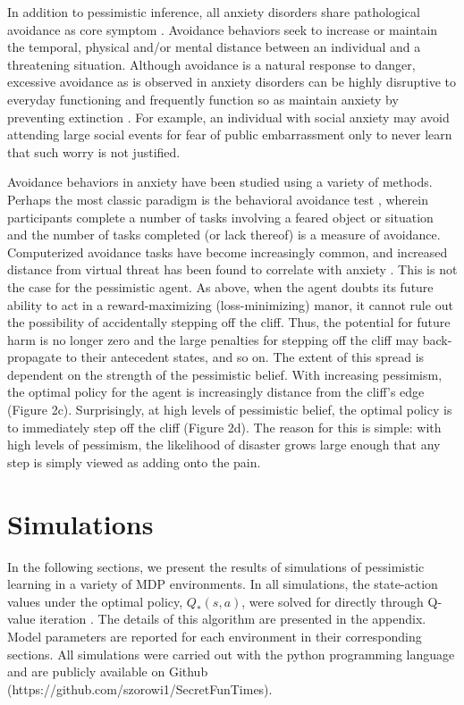 \documentclass[11pt]{article} %
\begin{document}
In addition to pessimistic inference, all anxiety disorders share pathological avoidance as core symptom \citep{dsm5, Krypotos2015, Arnaudova2017}. Avoidance behaviors seek to increase or maintain the temporal, physical and/or mental distance between an individual and a threatening situation. Although avoidance is a natural response to danger, excessive avoidance as is observed in anxiety disorders can be highly disruptive to everyday functioning \citep{Salter2004} and frequently function so as maintain anxiety by preventing extinction \citep{Arnaudova2017}. For example, an individual with social anxiety may avoid attending large social events for fear of public embarrassment only to never learn that such worry is not justified.

Avoidance behaviors in anxiety have been studied using a variety of methods. Perhaps the most classic paradigm is the behavioral avoidance test \citep{bandura1977}, wherein participants complete a number of tasks involving a feared object or situation and the number of tasks completed (or lack thereof) is a measure of avoidance. Computerized avoidance tasks have become increasingly common, and increased distance from virtual threat has been found to correlate with anxiety \citep{Bach2014, Bach2017, Sheynin2014}. This is not the case for the pessimistic agent. As above, when the agent doubts its future ability to act in a reward-maximizing (loss-minimizing) manor, it cannot rule out the possibility of accidentally stepping off the cliff. Thus, the potential for future harm is no longer zero and the large penalties for stepping off the cliff may back-propagate to their antecedent states, and so on. The extent of this spread is dependent on the strength of the pessimistic belief. With increasing pessimism, the optimal policy for the agent is increasingly distance from the cliff's edge (Figure 2c). Surprisingly, at high levels of pessimistic belief, the optimal policy is to immediately step off the cliff (Figure 2d). The reason for this is simple: with high levels of pessimism, the likelihood of disaster grows large enough that any step is simply viewed as adding onto the pain.

\section{Simulations}

In the following sections, we present the results of simulations of pessimistic learning in a variety of MDP environments. In all simulations, the state-action values under the optimal policy, $Q_*(s,a)$, were solved for directly through Q-value iteration \citep{SuttonBarto1998, SuttonBarto1998, bertsekas2005}. The details of this algorithm are presented in the appendix. Model parameters are reported for each environment in their corresponding sections. All simulations were carried out with the python programming language and are publicly available on Github (https://github.com/szorowi1/SecretFunTimes).
\end{document}
